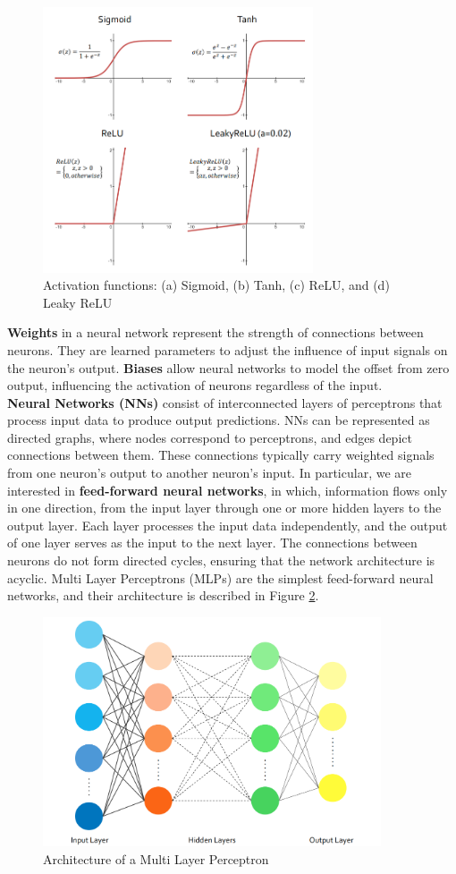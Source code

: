 \begin{figure}[ht]
    \centering
    \includegraphics[width=8cm]{images/Theory-DL/ActGraphs.png}
    \caption{Activation functions: (a) Sigmoid, (b) Tanh, (c) ReLU, and (d) Leaky ReLU}
    \label{fig:ActGraphs}
  \end{figure}
\textbf{Weights} in a neural network represent the strength of connections between neurons. They are learned parameters to adjust the influence of input signals on the neuron's output. \textbf{Biases} allow neural networks to model the offset from zero output, influencing the activation of neurons regardless of the input.\\
\textbf{Neural Networks (NNs)} consist of interconnected layers of perceptrons that process input data to produce output predictions. NNs can be represented as directed graphs, where nodes correspond to perceptrons, and edges depict connections between them. These connections typically carry weighted signals from one neuron's output to another neuron's input. In particular, we are interested in \textbf{feed-forward neural networks}, in which, information flows only in one direction, from the input layer through one or more hidden layers to the output layer. Each layer processes the input data independently, and the output of one layer serves as the input to the next layer. The connections between neurons do not form directed cycles, ensuring that the network architecture is acyclic. Multi Layer Perceptrons (MLPs) are the simplest feed-forward neural networks, and their architecture is described in Figure \ref{fig:MLP}. 
\begin{figure}[ht]
    \centering
    \includegraphics[width=10cm]{images/Theory-DL/MLP.png}
    \caption{Architecture of a Multi Layer Perceptron}
    \label{fig:MLP}
  \end{figure}
